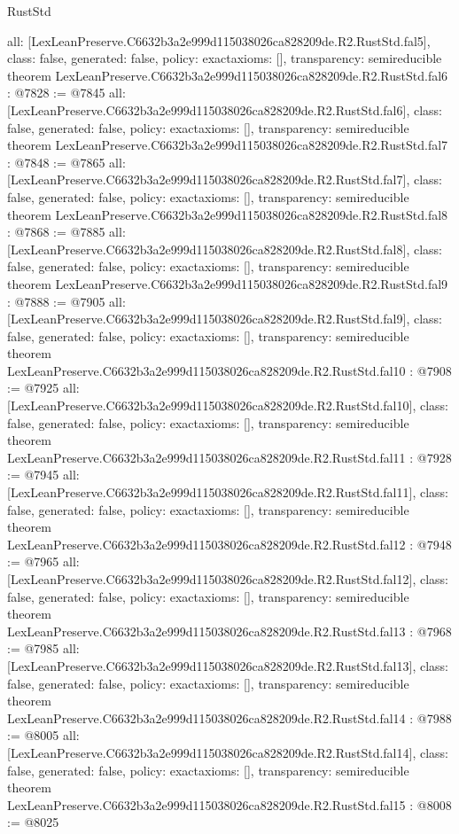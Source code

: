 \begin{lexlean}{RustStd}
\begin{coremodule}
{  all: [LexLeanPreserve.C6632b3a2e999d115038026ca828209de.R2.RustStd.fal5],
  class: false,
  generated: false,
  policy: exact{axioms: []},
  transparency: semireducible
}
theorem LexLeanPreserve.C6632b3a2e999d115038026ca828209de.R2.RustStd.fal6 : @7828 := @7845 {
  all: [LexLeanPreserve.C6632b3a2e999d115038026ca828209de.R2.RustStd.fal6],
  class: false,
  generated: false,
  policy: exact{axioms: []},
  transparency: semireducible
}
theorem LexLeanPreserve.C6632b3a2e999d115038026ca828209de.R2.RustStd.fal7 : @7848 := @7865 {
  all: [LexLeanPreserve.C6632b3a2e999d115038026ca828209de.R2.RustStd.fal7],
  class: false,
  generated: false,
  policy: exact{axioms: []},
  transparency: semireducible
}
theorem LexLeanPreserve.C6632b3a2e999d115038026ca828209de.R2.RustStd.fal8 : @7868 := @7885 {
  all: [LexLeanPreserve.C6632b3a2e999d115038026ca828209de.R2.RustStd.fal8],
  class: false,
  generated: false,
  policy: exact{axioms: []},
  transparency: semireducible
}
theorem LexLeanPreserve.C6632b3a2e999d115038026ca828209de.R2.RustStd.fal9 : @7888 := @7905 {
  all: [LexLeanPreserve.C6632b3a2e999d115038026ca828209de.R2.RustStd.fal9],
  class: false,
  generated: false,
  policy: exact{axioms: []},
  transparency: semireducible
}
theorem LexLeanPreserve.C6632b3a2e999d115038026ca828209de.R2.RustStd.fal10 : @7908 := @7925 {
  all: [LexLeanPreserve.C6632b3a2e999d115038026ca828209de.R2.RustStd.fal10],
  class: false,
  generated: false,
  policy: exact{axioms: []},
  transparency: semireducible
}
theorem LexLeanPreserve.C6632b3a2e999d115038026ca828209de.R2.RustStd.fal11 : @7928 := @7945 {
  all: [LexLeanPreserve.C6632b3a2e999d115038026ca828209de.R2.RustStd.fal11],
  class: false,
  generated: false,
  policy: exact{axioms: []},
  transparency: semireducible
}
theorem LexLeanPreserve.C6632b3a2e999d115038026ca828209de.R2.RustStd.fal12 : @7948 := @7965 {
  all: [LexLeanPreserve.C6632b3a2e999d115038026ca828209de.R2.RustStd.fal12],
  class: false,
  generated: false,
  policy: exact{axioms: []},
  transparency: semireducible
}
theorem LexLeanPreserve.C6632b3a2e999d115038026ca828209de.R2.RustStd.fal13 : @7968 := @7985 {
  all: [LexLeanPreserve.C6632b3a2e999d115038026ca828209de.R2.RustStd.fal13],
  class: false,
  generated: false,
  policy: exact{axioms: []},
  transparency: semireducible
}
theorem LexLeanPreserve.C6632b3a2e999d115038026ca828209de.R2.RustStd.fal14 : @7988 := @8005 {
  all: [LexLeanPreserve.C6632b3a2e999d115038026ca828209de.R2.RustStd.fal14],
  class: false,
  generated: false,
  policy: exact{axioms: []},
  transparency: semireducible
}
theorem LexLeanPreserve.C6632b3a2e999d115038026ca828209de.R2.RustStd.fal15 : @8008 := @8025 {
}
\end{coremodule}
\end{lexlean}
